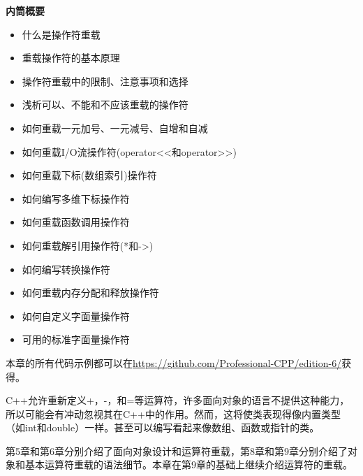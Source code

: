 \noindent
\textbf{内筒概要}

\begin{itemize}
\item
什么是操作符重载

\item
重载操作符的基本原理

\item
操作符重载中的限制、注意事项和选择

\item
浅析可以、不能和不应该重载的操作符

\item
如何重载一元加号、一元减号、自增和自减

\item
如何重载I/O流操作符(operator<{}<和operator>{}>)

\item
如何重载下标(数组索引)操作符

\item
如何编写多维下标操作符

\item
如何重载函数调用操作符

\item
如何重载解引用操作符(*和->)

\item
如何编写转换操作符

\item
如何重载内存分配和释放操作符

\item
如何自定义字面量操作符

\item
可用的标准字面量操作符
\end{itemize}

本章的所有代码示例都可以在\url{https://github.com/Professional-CPP/edition-6/}获得。

C++允许重新定义+，-，和=等运算符，许多面向对象的语言不提供这种能力，所以可能会有冲动忽视其在C++中的作用。然而，这将使类表现得像内置类型（如int和double）一样。甚至可以编写看起来像数组、函数或指针的类。

第5章和第6章分别介绍了面向对象设计和运算符重载，第8章和第9章分别介绍了对象和基本运算符重载的语法细节。本章在第9章的基础上继续介绍运算符的重载。












